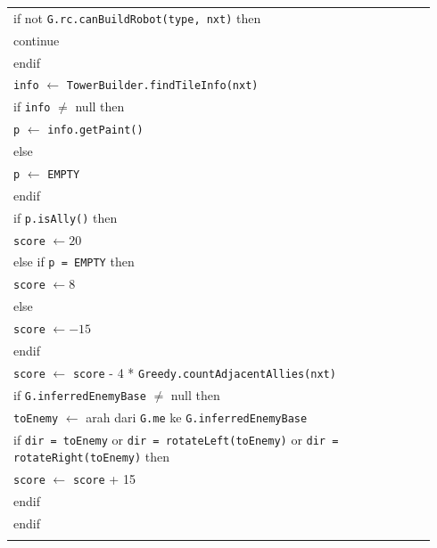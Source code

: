 \documentclass{article}
\newenvironment{pseudobox}
{
\centering
\begin{longtable}{|p{0.94\linewidth}|}
\hline
}
{
\\ \hline
\end{longtable}
\vspace{0.05cm}
}
\begin{document}
\begin{enumerate}[label=\alph*.]
\begin{enumerate}[label=\alph*.]
\begin{pseudobox}
\hspace*{3em}if not \texttt{G.rc.canBuildRobot(type, nxt)} then \\
\hspace*{4.5em}continue \\
\hspace*{3em}endif \\

\hspace*{3em}\texttt{info} $\leftarrow$ \texttt{TowerBuilder.findTileInfo(nxt)} \\
\hspace*{3em}if \texttt{info} $\neq$ null then \\
\hspace*{4.5em}\texttt{p} $\leftarrow$ \texttt{info.getPaint()} \\
\hspace*{3em}else \\
\hspace*{4.5em}\texttt{p} $\leftarrow$ \texttt{EMPTY} \\
\hspace*{3em}endif \\

\hspace*{3em}if \texttt{p.isAlly()} then \\
\hspace*{4.5em}\texttt{score} $\leftarrow 20$ \\
\hspace*{3em}else if \texttt{p = EMPTY} then \\
\hspace*{4.5em}\texttt{score} $\leftarrow 8$ \\
\hspace*{3em}else \\
\hspace*{4.5em}\texttt{score} $\leftarrow -15$ \\
\hspace*{3em}endif \\

\hspace*{3em}\texttt{score} $\leftarrow$ \texttt{score} - 4 * \texttt{Greedy.countAdjacentAllies(nxt)} \\

\hspace*{3em}if \texttt{G.inferredEnemyBase} $\neq$ null then \\
\hspace*{4.5em}\texttt{toEnemy} $\leftarrow$ arah dari \texttt{G.me} ke \texttt{G.inferredEnemyBase} \\
\hspace*{4.5em}if \texttt{dir = toEnemy} or \texttt{dir = rotateLeft(toEnemy)} or \texttt{dir = rotateRight(toEnemy)} then \\
\hspace*{6em}\texttt{score} $\leftarrow$ \texttt{score} + 15 \\
\hspace*{4.5em}endif \\
\hspace*{3em}endif \\


\end{pseudobox}
\end{enumerate}
\end{enumerate}
\end{document}
